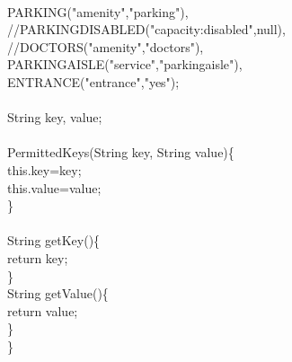 	\\
	PARKING("amenity","parking"),\\
	//PARKING\textunderscore DISABLED("capacity:disabled",null),\\
	//DOCTORS("amenity","doctors"),\\
	PARKING\textunderscore AISLE("service","parking\textunderscore aisle"),\\
	ENTRANCE("entrance","yes");\\
	\\
	String key, value;\\
	\\
	PermittedKeys(String key, String value)\{\\
		this.key=key;\\
		this.value=value;\\
	\}\\
	\\
	String getKey()\{\\
		return key;\\
	\}\\
	String getValue()\{\\
		return value;\\
	\}\\
\}\\